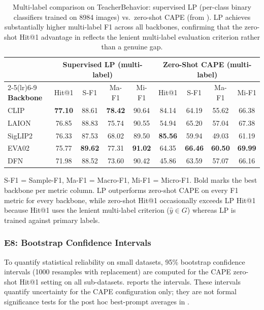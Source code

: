 \documentclass[symmetry,article,submit,pdftex,moreauthors]{Definitions/mdpi}
\begin{document}
\begin{table}[H]
\caption{Multi-label comparison on TeacherBehavior: supervised LP (per-class binary classifiers trained on 8984 images) vs.\ zero-shot CAPE (from ). LP achieves substantially higher multi-label F1 across all backbones, confirming that the zero-shot Hit@1 advantage in  reflects the lenient multi-label evaluation criterion rather than a genuine gap.}
\label{tab:linear_probe_ml}
\centering
\small
\setlength{\tabcolsep}{3.5pt}
\begin{tabular}{l cccc cccc}
\toprule
 & \multicolumn{4}{c}{\textbf{Supervised LP (multi-label)}} & \multicolumn{4}{c}{\textbf{Zero-Shot CAPE (multi-label)}} \\
\cmidrule(lr){2-5}\cmidrule(lr){6-9}
\textbf{Backbone} & Hit@1 & S-F1 & Ma-F1 & Mi-F1 & Hit@1 & S-F1 & Ma-F1 & Mi-F1 \\
\midrule
CLIP & \textbf{77.10} & 88.61 & \textbf{78.42} & 90.64 & 84.14 & 64.19 & 55.62 & 66.38 \\
LAION & 76.85 & 88.83 & 75.74 & 90.55 & 54.94 & 65.20 & 57.04 & 67.38 \\
SigLIP2 & 76.33 & 87.53 & 68.02 & 89.50 & \textbf{85.56} & 59.94 & 49.03 & 61.19 \\
EVA02 & 75.77 & \textbf{89.62} & 77.31 & \textbf{91.02} & 64.35 & \textbf{66.46} & \textbf{60.50} & \textbf{69.99} \\
DFN & 71.98 & 88.52 & 73.60 & 90.42 & 45.86 & 63.59 & 57.07 & 66.16 \\
\bottomrule
\end{tabular}
\vspace{3pt}
{\footnotesize S-F1 = Sample-F1, Ma-F1 = Macro-F1, Mi-F1 = Micro-F1. Bold marks the best backbone per metric column. LP outperforms zero-shot CAPE on every F1 metric for every backbone, while zero-shot Hit@1 occasionally exceeds LP Hit@1 because Hit@1 uses the lenient multi-label criterion ($\hat{y}\in G$) whereas LP is trained against primary labels.}
\end{table}


\subsubsection{E8: Bootstrap Confidence Intervals}
\label{sec:e8_bootstrap}

To quantify statistical reliability on small datasets, 95\% bootstrap confidence intervals (1000 resamples with replacement) are computed for the CAPE zero-shot Hit@1 setting on all sub-datasets.  reports the intervals. These intervals quantify uncertainty for the CAPE configuration only; they are not formal significance tests for the post hoc best-prompt averages in .
\end{document}
